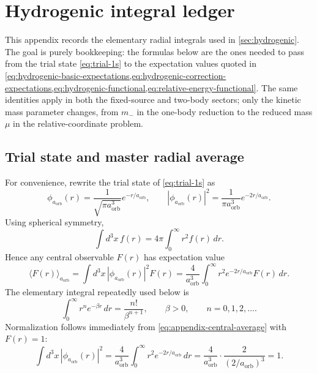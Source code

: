 \documentclass[11pt]{article}
\theoremstyle{plain}
\theoremstyle{definition}
\theoremstyle{remark}
\newcommand{\aorb}{a_{\mathrm{orb}}}
\begin{document}
\section{Hydrogenic integral ledger}\label{app:hydrogenic-integrals}

This appendix records the elementary radial integrals used in \cref{sec:hydrogenic}. The goal is purely bookkeeping: the formulas below are the ones needed to pass from the trial state \cref{eq:trial-1s} to the expectation values quoted in \cref{eq:hydrogenic-basic-expectations,eq:hydrogenic-correction-expectations,eq:hydrogenic-functional,eq:relative-energy-functional}. The same identities apply in both the fixed-source and two-body sectors; only the kinetic mass parameter changes, from $m_-$ in the one-body reduction to the reduced mass $\mu$ in the relative-coordinate problem.

\subsection{Trial state and master radial average}\label{subsec:hydrogenic-integral-master}

For convenience, rewrite the trial state of \cref{eq:trial-1s} as
\begin{equation}
\phi_{\aorb}(r)=\frac{1}{\sqrt{\pi\aorb^3}}e^{-r/\aorb},
\qquad
|\phi_{\aorb}(r)|^2 = \frac{1}{\pi\aorb^3}e^{-2r/\aorb}.
\label{eq:appendix-trial-state}
\end{equation}
Using spherical symmetry,
\begin{equation}
\int d^3x\,f(r)
=
4\pi\int_0^\infty r^2 f(r)\,dr.
\label{eq:appendix-radial-measure}
\end{equation}
Hence any central observable $F(r)$ has expectation value
\begin{equation}
\bigl\langle F(r)\bigr\rangle_{\aorb}
=
\int d^3x\,|\phi_{\aorb}(r)|^2 F(r)
=
\frac{4}{\aorb^3}\int_0^\infty r^2 e^{-2r/\aorb}F(r)\,dr.
\label{eq:appendix-central-average}
\end{equation}
The elementary integral repeatedly used below is
\begin{equation}
\int_0^\infty r^n e^{-\beta r}\,dr = \frac{n!}{\beta^{n+1}},
\qquad
\beta>0,
\qquad
n=0,1,2,\dots.
\label{eq:appendix-gamma-identity}
\end{equation}
Normalization follows immediately from \cref{eq:appendix-central-average} with $F(r)=1$:
\begin{equation}
\int d^3x\,|\phi_{\aorb}(r)|^2
=
\frac{4}{\aorb^3}\int_0^\infty r^2 e^{-2r/\aorb}\,dr
=
\frac{4}{\aorb^3}\cdot \frac{2}{(2/\aorb)^3}
=1.
\label{eq:appendix-normalization-check}
\end{equation}
\end{document}
